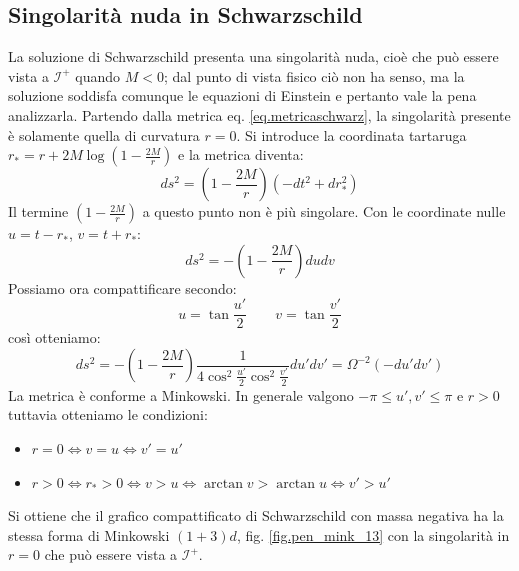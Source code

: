 \subsection{Singolarità nuda in Schwarzschild}
La soluzione di Schwarzschild presenta una singolarità nuda, cioè che può essere vista a $\mathcal{I}^+$ quando $M<0$; dal punto di vista fisico ciò non ha senso, ma la soluzione soddisfa comunque le equazioni di Einstein e pertanto vale la pena analizzarla.
Partendo dalla metrica eq. \ref{eq.metricaschwarz}, la singolarità presente è solamente quella di curvatura $r=0$. Si introduce la coordinata tartaruga $ r_* = r + 2M\log\left(1-\frac{2M}{r}\right) $ e la metrica diventa:
\begin{equation*}
    ds^2 = \left(1-\frac{2M}{r}\right)(-dt^2 + dr^2_*)
\end{equation*}
Il termine $\left(1-\frac{2M}{r}\right)$ a questo punto non è più singolare. Con le coordinate nulle $u=t-r_*$, $v = t + r_*$:
\begin{equation*}
    ds^2 = - \left(1-\frac{2M}{r}\right)dudv
\end{equation*}
Possiamo ora compattificare secondo:
\begin{equation*}
    u = \tan\frac{u'}{2} \qquad v = \tan\frac{v'}{2}
\end{equation*}
così otteniamo:
\begin{equation*}
    ds^2 = - \left(1-\frac{2M}{r}\right)\frac{1}{4\cos^2\frac{u'}{2}\cos^2\frac{v'}{2}}du'dv' = \Omega^{-2}(-du'dv')
\end{equation*}
La metrica è conforme a Minkowski. In generale valgono $-\pi \leq u', v' \leq \pi$ e $r>0$ tuttavia otteniamo le condizioni:
\begin{itemize}
        \item $r=0 \iff v=u \iff v'=u'$
        \item $r>0 \iff r_*>0 \iff v>u \iff \arctan v > \arctan u \iff v'>u'$
\end{itemize}
Si ottiene che il grafico compattificato di Schwarzschild con massa negativa ha la stessa forma di Minkowski $(1+3)d$, fig. \ref{fig.pen_mink_13} con la singolarità in $r=0$ che può essere vista a $\mathcal{I}^+$.